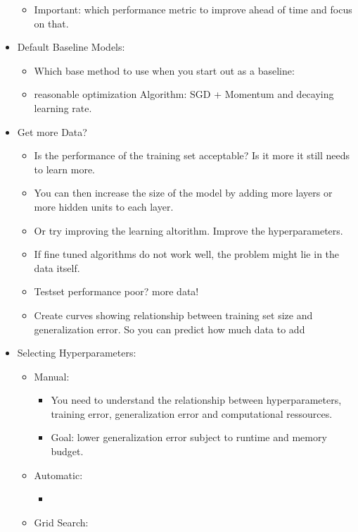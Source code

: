 \begin{itemize}[noitemsep,nolistsep]
\begin{itemize}[noitemsep,nolistsep]
		\item Important: which performance metric to improve ahead of time and focus on that.
	\end{itemize}
	\item Default Baseline Models:
	\begin{itemize}[noitemsep,nolistsep]
		\item Which base method to use when you start out as a baseline:
		\item reasonable optimization Algorithm: SGD + Momentum and decaying learning rate.
	\end{itemize}
	\item Get more Data?
	\begin{itemize}[noitemsep,nolistsep]
		\item Is the performance of the training set acceptable? Is it more it still needs to learn more.
		\item You can then increase the size of the model by adding more layers or more hidden units to each layer.
		\item Or try improving the learning altorithm. Improve the hyperparameters.
		\item If fine tuned algorithms do not work well, the problem might lie in the data itself.
		\item Testset performance poor? more data!
		\item Create curves showing relationship between training set size and generalization error. So you can predict how much data to add
	\end{itemize}
	\item Selecting Hyperparameters:
	\begin{itemize}[noitemsep,nolistsep]
		\item Manual:
		\begin{itemize}[noitemsep,nolistsep]
			\item You need to understand the relationship between hyperparameters, training error, generalization error and computational ressources.
			\item Goal: lower generalization error subject to runtime and memory budget.
		\end{itemize}
		\item Automatic:
		\begin{itemize}[noitemsep,nolistsep]
			\item 
		\end{itemize}
		\item Grid Search:
		\begin{itemize}

\end{itemize}
\end{itemize}
\end{itemize}
